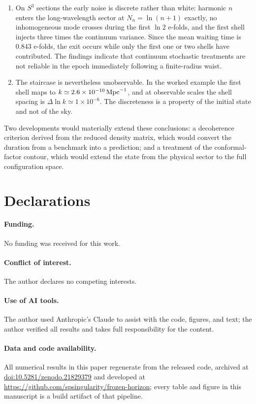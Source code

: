 \documentclass[aps,prd,twocolumn,superscriptaddress,nofootinbib,longbibliography]{revtex4-2}
\newcommand{\Mpc}{\,{\rm Mpc}^{-1}}
\begin{document}
\begin{enumerate}
\item On $S^3$ sections the early noise is discrete rather than white:
harmonic $n$ enters the long-wavelength sector at $N_n=\ln(n+1)$ exactly, no
inhomogeneous mode crosses during the first $\ln2$ e-folds, and the first
shell injects three times the continuum variance. Since the mean waiting
time is $0.843$ e-folds, the exit occurs while only the first one or two
shells have contributed. The findings indicate that continuum stochastic
treatments are not reliable in the epoch immediately following a
finite-radius waist.

\item The staircase is nevertheless unobservable. In the worked example the
first shell maps to $k\simeq2.6\times10^{-10}\Mpc$, and at observable scales
the shell spacing is $\Delta\ln k\simeq1\times10^{-6}$. The discreteness is a
property of the initial state and not of the sky.
\end{enumerate}

Two developments would materially extend these conclusions: a decoherence
criterion derived from the reduced density matrix, which would convert the
duration from a benchmark into a prediction; and a treatment of the
conformal-factor contour, which would extend the state from the physical
sector to the full configuration space.

\section*{Declarations}
\paragraph{Funding.} No funding was received for this work.
\paragraph{Conflict of interest.} The author declares no competing
interests.
\paragraph{Use of AI tools.} The author used Anthropic's Claude to assist
with the code, figures, and text; the author verified all results and takes
full responsibility for the content.
\paragraph{Data and code availability.} All numerical results in this paper
regenerate from the released code, archived at
\href{https://doi.org/10.5281/zenodo.21829379}{doi:10.5281/zenodo.21829379}
and developed at \url{https://github.com/spsingularity/frozen-horizon}; every table and figure in this manuscript is a build artifact
of that pipeline.



\end{document}
